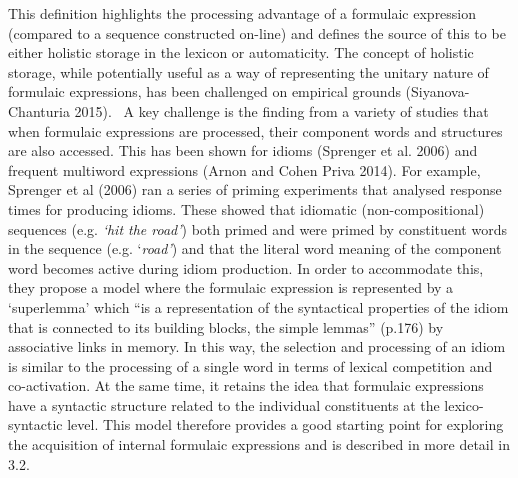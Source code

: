 \documentclass[12pt]{article}
\newenvironment{styleStandard}{\setlength\leftskip{0cm}\setlength\rightskip{0cm plus 1fil}\setlength\parindent{0cm}\setlength\parfillskip{0pt plus 1fil}\setlength\parskip{0in plus 1pt}\writerlistparindent\writerlistleftskip\leavevmode\normalfont\normalsize\writerlistlabel\ignorespaces}{\unskip\vspace{0.111in plus 0.0111in}\par}
\newcommand\writerlistleftskip{}
\newcommand\writerlistparindent{}
\newcommand\writerlistlabel{}
\begin{document}
\begin{styleStandard}
This definition highlights the processing advantage of a formulaic expression (compared to a sequence constructed on-line) and defines the source of this to be either holistic storage in the lexicon or automaticity. The concept of holistic storage, while potentially useful as a way of representing the unitary nature of formulaic expressions, has been challenged on empirical grounds (Siyanova-Chanturia 2015). \ A key challenge is the finding from a variety of studies that when formulaic expressions are processed, their component words and structures are also accessed. This has been shown for idioms (Sprenger et al. 2006) and frequent multiword expressions (Arnon and Cohen Priva 2014). For example, Sprenger et al (2006) ran a series of priming experiments that analysed response times for producing idioms. These showed that idiomatic (non-compositional) sequences (e.g. \textit{‘hit the road’}) both primed and were primed by constituent words in the sequence (e.g. ‘\textit{road’}) and that the literal word meaning of the component word becomes active during idiom production. In order to accommodate this, they propose a model where the formulaic expression is represented by a ‘superlemma’ which “is a representation of the syntactical properties of the idiom that is connected to its building blocks, the simple lemmas” (p.176) by associative links in memory. In this way, the selection and processing of an idiom is similar to the processing of a single word in terms of lexical competition and co-activation. At the same time, it retains the idea that formulaic expressions have a syntactic structure related to the individual constituents at the lexico-syntactic level. This model therefore provides a good starting point for exploring the acquisition of internal formulaic expressions and is described in more detail in 3.2.
\end{styleStandard}
\end{document}
